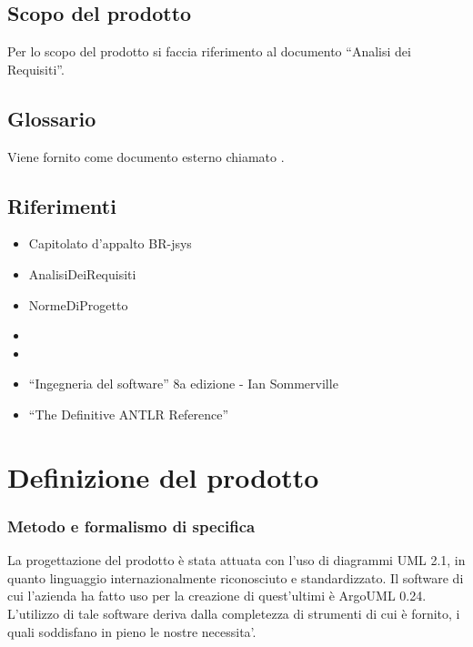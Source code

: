 \documentclass[11pt,titlepage,a4paper]{report}
\begin{document}
\section{Scopo del prodotto}
Per lo scopo del prodotto si faccia riferimento al documento ``Analisi dei Requisiti''.
\section{Glossario}
Viene fornito come documento esterno chiamato \Glossario .
\section{Riferimenti}
\begin{itemize}
\item Capitolato d'appalto BR-jsys
\item AnalisiDeiRequisiti
\item NormeDiProgetto
\item \PdP
\item \PdQ
\item ``Ingegneria del software'' 8a edizione - Ian Sommerville 
\item ``The Definitive ANTLR Reference''
\end{itemize}

\chapter{Definizione del prodotto}
\subsection{Metodo e formalismo di specifica}
La progettazione del prodotto \`e stata attuata con l'uso di diagrammi UML 2.1, in quanto linguaggio internazionalmente riconosciuto e standardizzato.
Il software di cui l’azienda ha fatto uso per la creazione di quest'ultimi \`e ArgoUML 0.24. L'utilizzo di tale software deriva dalla completezza
di strumenti di cui \`e fornito, i quali soddisfano in pieno le nostre necessita'.
\end{document}
